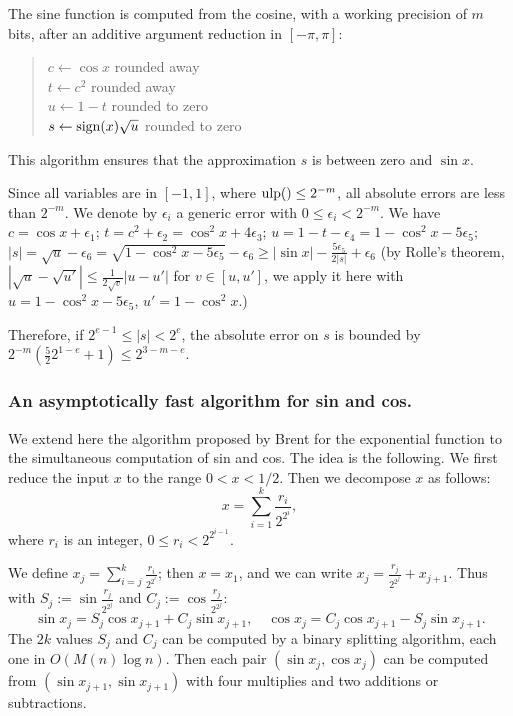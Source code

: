 \documentclass[12pt]{amsart}
\def\ulp{{\rm ulp}}
\begin{document}
The sine function is computed from the cosine, with a working precision of
$m$ bits, after an additive argument reduction in $[-\pi, \pi]$:
\begin{quote}
$c \leftarrow \cos x$ rounded away \\
$t \leftarrow c^2$ rounded away \\
$u \leftarrow 1 - t$ rounded to zero \\
$s \leftarrow {\rm sign}(x) \sqrt{u}$ rounded to zero \\
\end{quote}
This algorithm ensures that the approximation $s$ is between zero and $\sin x$.

Since all variables are in $[-1, 1]$, where $\ulp() \leq 2^{-m}$,
all absolute errors are less than $2^{-m}$.
We denote by $\epsilon_i$ a generic error with $0 \leq \epsilon_i < 2^{-m}$.
We have $c = \cos x + \epsilon_1$;
$t = c^2 + \epsilon_2 = \cos^2 x + 4 \epsilon_3$;
$u = 1 - t - \epsilon_4 = 1 - \cos^2 x - 5 \epsilon_5$;
$|s| = \sqrt{u} - \epsilon_6 =
\sqrt{1 - \cos^2 x - 5 \epsilon_5} - \epsilon_6
\geq \left|\sin x\right| - \frac{5 \epsilon_5}{2 |s|} + \epsilon_6$
(by Rolle's theorem,
$|\sqrt{u} - \sqrt{u'}| \le \frac{1}{2 \sqrt{v}} |u-u'|$ for
$v \in [u, u']$, we apply it here with $u=1 - \cos^2 x - 5 \epsilon_5$,
$u'=1 - \cos^2 x$.)

Therefore, if $2^{e-1} \leq |s| < 2^e$, the absolute error on $s$
is bounded by $2^{-m} (\frac{5}{2} 2^{1-e}+1) \leq 2^{3-m-e}$.

\subsubsection{An asymptotically fast algorithm for sin and cos.}
We extend here the algorithm proposed by Brent for the exponential function
to the simultaneous computation of sin and cos. The idea is the following.
We first reduce the input $x$ to the range $0 < x < 1/2$.
Then we decompose $x$ as follows:
\[ x = \sum_{i=1}^{k} \frac{r_i}{2^{2^i}}, \]
where $r_i$ is an integer, $0 \leq r_i < 2^{2^{i-1}}$.

We define $x_j = \sum_{i=j}^{k} \frac{r_i}{2^{2^i}}$; then $x = x_1$,
and we can write $x_j = \frac{r_j}{2^{2^j}} + x_{j+1}$. Thus with
$S_j := \sin \frac{r_j}{2^{2^j}}$ and $C_j := \cos \frac{r_j}{2^{2^j}}$:
\[ \sin x_j = S_j \cos x_{j+1} + C_j \sin x_{j+1}, \quad
   \cos x_j = C_j \cos x_{j+1} - S_j \sin x_{j+1}. \]
The $2k$ values $S_j$ and $C_j$ can be computed by a binary splitting
algorithm, each one in $O(M(n) \log n)$.
Then each pair $(\sin x_j, \cos x_j)$ can be computed from
$(\sin x_{j+1}, \sin x_{j+1})$ with four multiplies and two additions or
subtractions.
\end{document}
